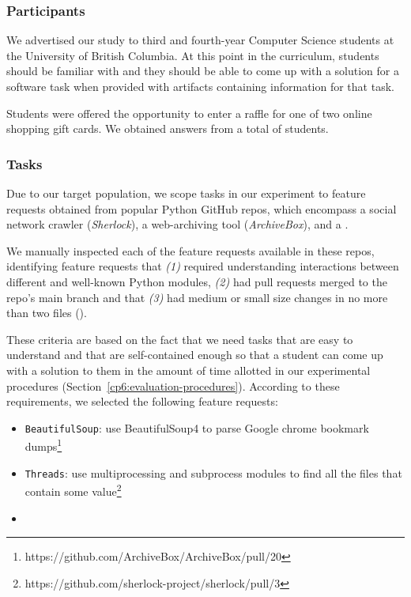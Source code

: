 \subsubsection{Participants}



We advertised our study to third and fourth-year Computer Science students at the University of British Columbia. 
At this point in the curriculum, students should be familiar with  and they should be able to come up with a solution 
for a software task when provided with artifacts containing information for that task.


Students were offered the opportunity to enter a raffle for one of two  online shopping gift cards.
We obtained answers from a total of \red{\#} students. 


\subsubsection{Tasks}

Due to our target population, we scope tasks in our experiment to  
feature requests obtained from popular Python GitHub repos,
which encompass a social network crawler (\textit{Sherlock}),
a web-archiving tool (\textit{ArchiveBox}), and a .



We manually inspected each of the feature requests available in these repos, identifying
feature requests that
\textit{(1)}  required understanding interactions between different and well-known Python modules, 
\textit{(2)}  had pull requests merged to the repo's main branch and that
\textit{(3)}  had medium or small size changes in no more than two files ().


These criteria are based on the fact that we need tasks that are easy to understand and that are self-contained enough so that a student can come up with a solution to them in the amount of time allotted in our experimental procedures (Section~\ref{cp6:evaluation-procedures}).
According to these requirements, we selected the following feature requests:


\begin{itemize}
    \item \texttt{BeautifulSoup}: use BeautifulSoup4 to parse Google chrome bookmark dumps\footnote{https://github.com/ArchiveBox/ArchiveBox/pull/20}
    \item  \texttt{Threads}: use multiprocessing and subprocess modules to find all the files that contain some value\footnote{https://github.com/sherlock-project/sherlock/pull/3}
    \item {}
\end{itemize}



